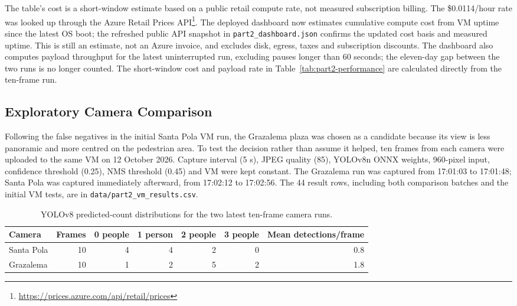 \documentclass{article}
\begin{document}
    The table's cost is a short-window estimate based on a public retail compute rate, not measured subscription billing. The \$0.0114/hour rate was looked up through the Azure Retail Prices API\footnote{\url{https://prices.azure.com/api/retail/prices}}. The deployed dashboard now estimates cumulative compute cost from VM uptime since the latest OS boot; the refreshed public API snapshot in \texttt{part2\_dashboard.json} confirms the updated cost basis and measured uptime. This is still an estimate, not an Azure invoice, and excludes disk, egress, taxes and subscription discounts. The dashboard also computes payload throughput for the latest uninterrupted run, excluding pauses longer than 60 seconds; the eleven-day gap between the two runs is no longer counted. The short-window cost and payload rate in Table~\ref{tab:part2-performance} are calculated directly from the ten-frame run.

    \subsection{Exploratory Camera Comparison}

    Following the false negatives in the initial Santa Pola VM run, the Grazalema plaza was chosen as a candidate because its view is less panoramic and more centred on the pedestrian area. To test the decision rather than assume it helped, ten frames from each camera were uploaded to the same VM on 12 October 2026. Capture interval (5 s), JPEG quality (85), YOLOv8n ONNX weights, 960-pixel input, confidence threshold (0.25), NMS threshold (0.45) and VM were kept constant. The Grazalema run was captured from 17:01:03 to 17:01:48; Santa Pola was captured immediately afterward, from 17:02:12 to 17:02:56. The 44 result rows, including both comparison batches and the initial VM tests, are in \texttt{data/part2\_vm\_results.csv}.

    \begin{table}[H]
        \centering
        \small
        \begin{tabular}{lrrrrrr}
            \toprule
            \textbf{Camera} & \textbf{Frames} & \textbf{0 people} & \textbf{1 person} & \textbf{2 people} & \textbf{3 people} & \textbf{Mean detections/frame} \\
            \midrule
            Santa Pola & 10 & 4 & 4 & 2 & 0 & 0.8 \\
            Grazalema & 10 & 1 & 2 & 5 & 2 & 1.8 \\
            \bottomrule
        \end{tabular}
        \caption{YOLOv8 predicted-count distributions for the two latest ten-frame camera runs.}
        \label{tab:camera-comparison}
    \end{table}
\end{document}
